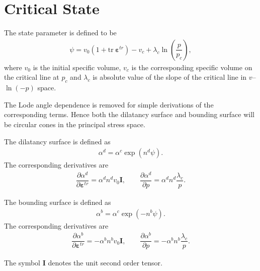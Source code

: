 \documentclass[11pt,fleqn,3p]{elsarticle}
\newcommand*{\tr}[1]{\mathrm{tr}~#1}
\newcommand*{\pfrac}[2]{\dfrac{\partial#1}{\partial#2}}
\begin{document}
\section{Critical State}
The state parameter is defined to be
\begin{gather*}
\psi=v_0\left(1+\tr{\mathbold{\varepsilon}^{tr}}\right)-v_c+\lambda_c\ln\left(\dfrac{p}{p_c}\right),
\end{gather*}
where $v_0$ is the initial specific volume, $v_c$ is the corresponding specific volume on the critical line at $p_c$ and $\lambda_c$ is absolute value of the slope of the critical line in $v$--$\ln(-p)$ space.

The Lode angle dependence is removed for simple derivations of the corresponding terms. Hence both the dilatancy surface and bounding surface will be circular cones in the principal stress space.

The dilatancy surface is defined as
\begin{gather*}
\alpha^d=\alpha^c\exp\left(n^d\psi\right).
\end{gather*}
The corresponding derivatives are
\begin{gather*}
\pfrac{\alpha^d}{\mathbold{\varepsilon}^{tr}}=\alpha^dn^dv_0\mathbold{I},\qquad
\pfrac{\alpha^d}{p}=\alpha^dn^d\dfrac{\lambda_c}{p}.
\end{gather*}

The bounding surface is defined as
\begin{gather*}
\alpha^b=\alpha^c\exp\left(-n^b\psi\right).
\end{gather*}
The corresponding derivatives are
\begin{gather*}
\pfrac{\alpha^b}{\mathbold{\varepsilon}^{tr}}=-\alpha^bn^bv_0\mathbold{I},\qquad
\pfrac{\alpha^b}{p}=-\alpha^bn^b\dfrac{\lambda_c}{p}.
\end{gather*}

The symbol $\mathbold{I}$ denotes the unit second order tensor.
\end{document}
